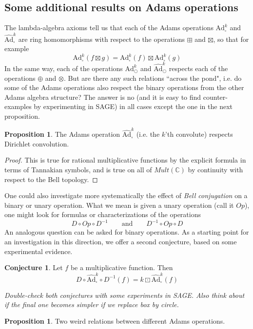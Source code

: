 \documentclass[a4paper]{article}
\theoremstyle{definition}
\newtheorem{conjecture}{Conjecture}[section]
\newtheorem{proposition}[theorem]{Proposition}
\theoremstyle{remark}
\newcommand{\adam}[1]{\text{Ad}^{#1}_{\bigcirc}}
\newcommand{\hatadam}[1]{\widehat{\text{Ad}}^{#1}_{\bigcirc}}
\newcommand{\boxadam}[1]{\text{Ad}^{#1}_{\square}}
\newcommand{\hatboxadam}[1]{\widehat{\text{Ad}}^{#1}_{\square}}
\newcommand{\C}{\mathbb{C}}
\begin{document}
\subsection{Some additional results on Adams operations}

The lambda-algebra axioms tell us that each of the Adams operations $\boxadam{k}$ and $\hatboxadam{k}$ are ring homomorphisms with respect to the operations $\boxplus$ and $\boxtimes$, so that for example
$$  \boxadam{k}(f \boxtimes g) = \boxadam{k}(f) \boxtimes \boxadam{k}(g) $$
In the same way, each of the operations $\adam{k}$ and $\hatadam{k}$ respects each of the operations $\oplus$ and $\otimes$. But are there any such relations ``across the pond", i.e. do some of the Adams operations also respect the binary operations from the other Adams algebra structure? The answer is no (and it is easy to find counter-examples by experimenting in SAGE) in all cases except the one in the next proposition.

\begin{proposition}
The Adams operation $\hatboxadam{k}$ (i.e. the $k$'th convolute) respects Dirichlet convolution.
\end{proposition}
\begin{proof}
This is true for rational multiplicative functions by the explicit formula in terms of Tannakian symbols, and is true on all of $Mult(\C)$ by continuity with respect to the Bell topology.
\end{proof}


One could also investigate more systematically the effect of \emph{Bell conjugation} on a binary or unary operation. What we mean is given a unary operation (call it $Op$), one might look for formulas or characterizations of the operations
$$ D \circ Op \circ D^{-1}  \quad \quad \textrm{and}  \quad \quad D^{-1} \circ Op \circ D $$
An analogous question can be asked for binary operations. As a starting point for an investigation in this direction, we offer a second conjecture, based on some experimental evidence.
\begin{conjecture}
Let $f$ be a multiplicative function. Then 
$$ D \circ \hatboxadam{k} \circ D^{-1} ( f ) = k \boxdot \hatboxadam{k} (f)  $$
\end{conjecture}

\emph{Double-check both conjectures with some experiments in SAGE. Also think about if the final one becomes simpler if we replace box by circle. }


\begin{proposition}
Two weird relations between different Adams operations.
\end{proposition}
\end{document}
